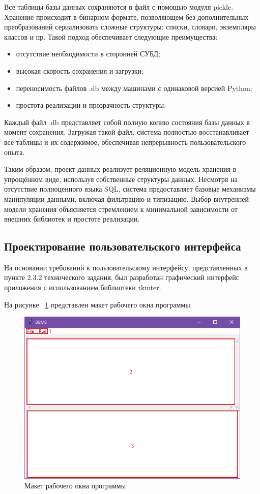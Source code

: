 Все таблицы базы данных сохраняются в файл с помощью модуля pickle. Хранение происходит в бинарном формате, позволяющем без дополнительных преобразований сериализовать сложные структуры: списки, словари, экземпляры классов и пр. Такой подход обеспечивает следующие преимущества:
\begin{itemize}
	\item отсутствие необходимости в сторонней СУБД;	
	\item высокая скорость сохранения и загрузки;	
	\item переносимость файлов .db между машинами с одинаковой версией Python;	
	\item простота реализации и прозрачность структуры.
\end{itemize}

Каждый файл .db представляет собой полную копию состояния базы данных в момент сохранения. Загружая такой файл, система полностью восстанавливает все таблицы и их содержимое, обеспечивая непрерывность пользовательского опыта.

Таким образом, проект данных реализует реляционную модель хранения в упрощённом виде, используя собственные структуры данных. Несмотря на отсутствие полноценного языка SQL, система предоставляет базовые механизмы манипуляции данными, включая фильтрацию и типизацию. Выбор внутренней модели хранения объясняется стремлением к минимальной зависимости от внешних библиотек и простоте реализации.

\subsection{Проектирование пользовательского интерфейса}

На основании требований к пользовательскому интерфейсу, представленных в пункте 2.3.2 технического задания, был разработан графический интерфейс приложения с использованием библиотеки tkinter.

На рисунке ~\ref{fig:interface} представлен макет рабочего окна программы. 

\begin{figure}[H]
	\centering
	\includegraphics[width=1\linewidth]{images/interface}
	\caption{Макет рабочего окна программы}
	\label{fig:interface}
\end{figure}

